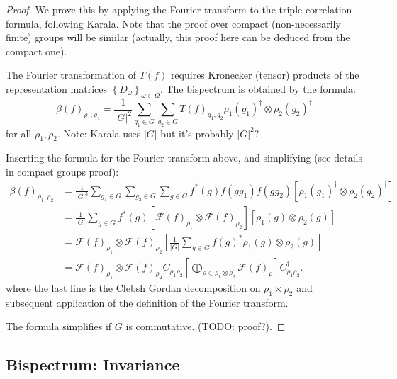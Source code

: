 \documentclass{article}
\begin{document}
\begin{proof}
We prove this by applying the Fourier transform to the triple correlation formula, following Karala. Note that the proof over compact (non-necessarily finite) groups will be similar (actually, this proof here can be deduced from the compact one).

The Fourier transformation of $T(f)$ requires Kronecker (tensor) products of the representation matrices $\left\{D_\omega\right\}_{\omega \in \Omega}$. The bispectrum is obtained by the formula:
\begin{equation}
    \beta(f)_{\rho_1, \rho_2}
    =
    \frac{1}{|G|^2} \sum_{g_1 \in G} \sum_{g_2 \in G}
        T(f)_{g_1, g_2} \rho_1(g_1)^{\dagger} \otimes \rho_2(g_2)^{\dagger}
\end{equation}
for all ${\rho_1}, {\rho_2}$. Note: Karala uses $|G|$ but it's probably $|G|^2$?

Inserting the formula for the Fourier transform above, and simplifying (see details in compact groups proof):
\begin{align*}
    \beta(f)_{\rho_1, \rho_2}
    &=
    \frac{1}{|G|^3}\sum_{g_1 \in G} \sum_{g_2 \in G} \sum_{g \in G}
       f^*(g)
       f\left(g g_1\right) f\left(g g_2\right)
            \left[
                \rho_1(g_1)^{\dagger} \otimes \rho_2(g_2)^{\dagger}
            \right] \\
    &= \frac{1}{|G|}
        \sum_{g \in G} f^*(g)
            [\mathcal{F}(f)_{\rho_1} \otimes \mathcal{F}(f)_{\rho_2}]
            \left[
                \rho_1(g) \otimes \rho_2(g)
            \right]\\
    &= \mathcal{F}(f)_{\rho_1} \otimes \mathcal{F}(f)_{\rho_2}
        \left[
            \frac{1}{|G|}
                \sum_{g \in G} f(g)^* \rho_1(g) \otimes \rho_2(g)
        \right] \\
    &=
\mathcal{F}(f)_{\rho_1} \otimes \mathcal{F}(f)_{\rho_2} C_{{\rho_1} {\rho_2}}
    \left[
    \bigoplus_{\rho \in \rho_1 \otimes \rho_2}
        \mathcal{F}(f)_\rho
    \right] C_{{\rho_1} {\rho_2}}^{\dagger} .
\end{align*}
where the last line is the Clebsh Gordan decomposition on $\rho_1 \times \rho_2$ and subsequent application of the definition of the Fourier transform.

The formula simplifies if $G$ is commutative. (TODO: proof?).

\end{proof}

\subsection{Bispectrum: Invariance}
\end{document}
